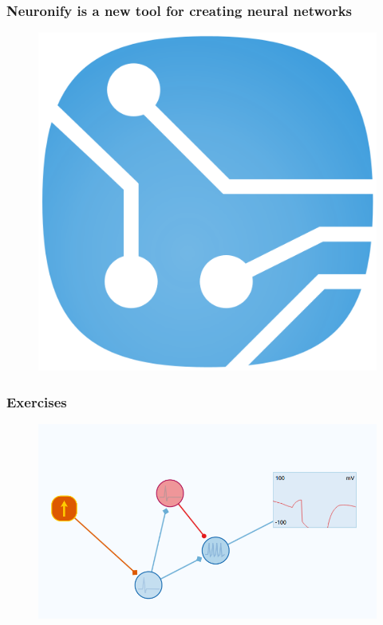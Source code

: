 \documentclass{beamer}
\begin{document}
\begin{frame}
\frametitle{Neuronify is a new tool for creating neural networks}
\begin{figure}
\includegraphics[height = 0.8\textheight]{logo.png}
\end{figure}
\end{frame}


\begin{frame}
\frametitle{Exercises}
\begin{figure}
\includegraphics[width = \textwidth]{exercises.png}
\end{figure}
\end{frame}
\end{document}
